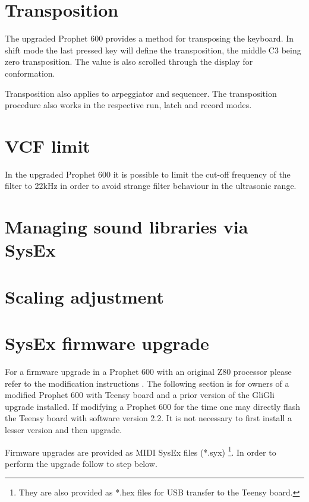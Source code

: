 \documentclass[landscape, 11pt, oneside]{report}
\newenvironment{flowtext}{\addmargin[0cm]{7cm}}{\endaddmargin} %
\begin{document}
\begin{flowtext}
\section{Transposition}\label{transposition}

The upgraded Prophet 600 provides a method for transposing the keyboard. In shift mode the last pressed key will define the transposition, the middle C3 being zero transposition. The value is also scrolled through the display for conformation. 

Transposition also applies to arpeggiator and sequencer. The transposition procedure also works in the respective run, latch and record modes.

\section{VCF limit}\label{limitsett}

In the upgraded Prophet 600 it is possible to limit the cut-off frequency of the filter to 22kHz in order to avoid strange filter behaviour in the ultrasonic range.

\section{Managing sound libraries via SysEx}\label{mididump}



\section{Scaling adjustment}\label{maintenance}



\section{SysEx firmware upgrade}\label{fwupgrade}

For a firmware upgrade in a Prophet 600 with an original Z80 processor please refer to the modification instructions \cite{modinstructions}. The following section is for owners of a modified Prophet 600 with Teensy board and a prior version of the GliGli upgrade installed. If modifying a Prophet 600 for the time one may directly flash the Teensy board with software version 2.2. It is not necessary to first install a lesser version and then upgrade.

Firmware upgrades are provided as MIDI SysEx files (*.syx) \footnote{They are also provided as *.hex files for USB transfer to the Teensy board.}. In order to perform the upgrade follow to step below.


\end{flowtext}
\end{document}
